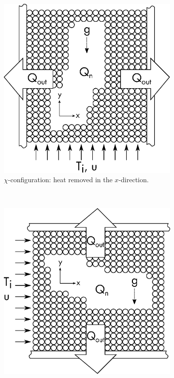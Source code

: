 \begin{figure}[!ht]
    \centering
    \begin{subfigure}[b]{0.22\textwidth}
        \includegraphics[width = \textwidth]{figures/x-domain.eps}
        \caption{$\chi$-configuration: heat removed in the $x$-direction.}\label{fig:x-domain}
    \end{subfigure}
    ~
    \begin{subfigure}[b]{0.22\textwidth}
        \includegraphics[width = \textwidth]{figures/y-domain.eps}

\end{subfigure}
\end{figure}
